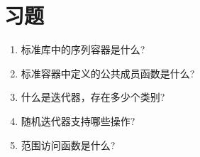 \section{习题}
\begin{enumerate}
\item
标准库中的序列容器是什么?

\item
标准容器中定义的公共成员函数是什么?

\item
什么是迭代器，存在多少个类别?

\item
随机迭代器支持哪些操作?

\item
范围访问函数是什么?
\end{enumerate}
